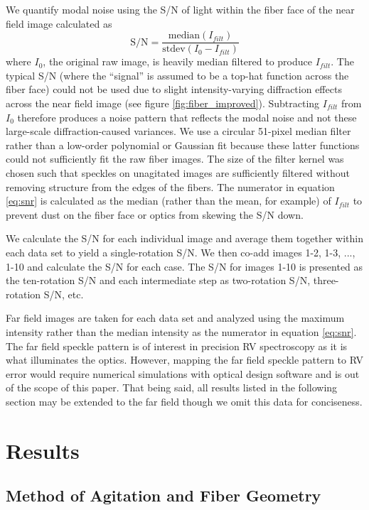 \documentclass[twocolumn]{emulateapj}
\begin{document}
We quantify modal noise using the S/N of light within the fiber face of the near field image calculated as
\begin{equation}
\mathrm{S/N} = \frac{\mathrm{median}(I_{filt})}{\mathrm{stdev}(I_0 - I_{filt})}
\label{eq:snr}
\end{equation}
where $I_0$, the original raw image, is heavily median filtered to produce $I_{filt}$. The typical S/N (where the ``signal'' is assumed to be a top-hat function across the fiber face) could not be used due to slight intensity-varying diffraction effects across the near field image (see figure \ref{fig:fiber_improved}). Subtracting $I_{filt}$ from $I_0$ therefore produces a noise pattern that reflects the modal noise and not these large-scale diffraction-caused variances. We use a circular 51-pixel median filter rather than a low-order polynomial or Gaussian fit because these latter functions could not sufficiently fit the raw fiber images. The size of the filter kernel was chosen such that speckles on unagitated images are sufficiently filtered without removing structure from the edges of the fibers. The numerator in equation \ref{eq:snr} is calculated as the median (rather than the mean, for example) of $I_{filt}$ to prevent dust on the fiber face or optics from skewing the S/N down.

We calculate the S/N for each individual image and average them together within each data set to yield a single-rotation S/N. We then co-add images 1-2, 1-3, ..., 1-10 and calculate the S/N for each case. The S/N for images 1-10 is presented as the ten-rotation S/N and each intermediate step as two-rotation S/N, three-rotation S/N, etc.

Far field images are taken for each data set and analyzed using the maximum intensity rather than the median intensity as the numerator in equation \ref{eq:snr}. The far field speckle pattern is of interest in precision RV spectroscopy as it is what illuminates the optics. However, mapping the far field speckle pattern to RV error would require numerical simulations with optical design software and is out of the scope of this paper. That being said, all results listed in the following section may be extended to the far field though we omit this data for conciseness.

\section{Results}
\label{sec:results}

\subsection{Method of Agitation and Fiber Geometry}
\label{subsec:ag_snr}
\end{document}
